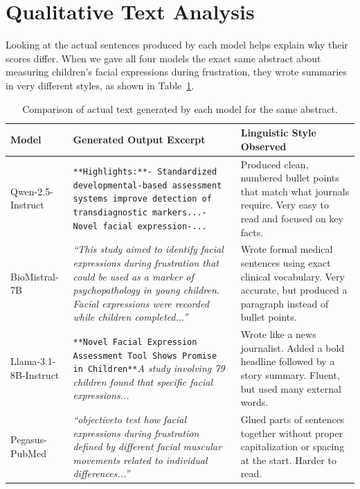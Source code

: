 \documentclass[11pt,a4paper]{article}
\begin{document}
\section{Qualitative Text Analysis}
\label{sec:qualitative}
Looking at the actual sentences produced by each model helps explain why their scores differ. When we gave all four models the exact same abstract about measuring children's facial expressions during frustration, they wrote summaries in very different styles, as shown in Table~\ref{tab:qualitative}.

\begin{table}[htbp]
    \centering
    \caption{Comparison of actual text generated by each model for the same abstract.}
    \label{tab:qualitative}
    \small
    \begin{tabularx}{\textwidth}{@{}lXX@{}}
        \toprule
        \textbf{Model} & \textbf{Generated Output Excerpt} & \textbf{Linguistic Style Observed} \\
        \midrule
        Qwen-2.5-Instruct & \texttt{**Highlights:**\newline - Standardized developmental-based assessment systems improve detection of transdiagnostic markers...\newline - Novel facial expression-...} & Produced clean, numbered bullet points that match what journals require. Very easy to read and focused on key facts. \\
        \midrule
        BioMistral-7B & \textit{``This study aimed to identify facial expressions during frustration that could be used as a marker of psychopathology in young children. Facial expressions were recorded while children completed...''} & Wrote formal medical sentences using exact clinical vocabulary. Very accurate, but produced a paragraph instead of bullet points. \\
        \midrule
        Llama-3.1-8B-Instruct & \texttt{**Novel Facial Expression Assessment Tool Shows Promise in Children**}\newline \textit{A study involving 79 children found that specific facial expressions...} & Wrote like a news journalist. Added a bold headline followed by a story summary. Fluent, but used many external words. \\
        \midrule
        Pegasus-PubMed & \textit{``objectiveto test how facial expressions during frustration defined by different facial muscular movements related to individual differences...''} & Glued parts of sentences together without proper capitalization or spacing at the start. Harder to read. \\
        \bottomrule
    \end{tabularx}
\end{table}
\end{document}
